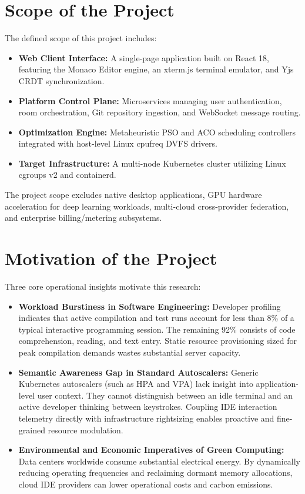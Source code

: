\documentclass[12pt,a4paper]{report}
\begin{document}
	\section{Scope of the Project}
	The defined scope of this project includes:
	\begin{itemize}
		\item \textbf{Web Client Interface:} A single-page application built on React 18, featuring the Monaco Editor engine, an xterm.js terminal emulator, and Yjs CRDT synchronization.
		\item \textbf{Platform Control Plane:} Microservices managing user authentication, room orchestration, Git repository ingestion, and WebSocket message routing.
		\item \textbf{Optimization Engine:} Metaheuristic PSO and ACO scheduling controllers integrated with host-level Linux cpufreq DVFS drivers.
		\item \textbf{Target Infrastructure:} A multi-node Kubernetes cluster utilizing Linux cgroups v2 and containerd.
	\end{itemize}
	
	The project scope excludes native desktop applications, GPU hardware acceleration for deep learning workloads, multi-cloud cross-provider federation, and enterprise billing/metering subsystems.
	
	\section{Motivation of the Project}
	Three core operational insights motivate this research:
	\begin{itemize}
		\item \textbf{Workload Burstiness in Software Engineering:} Developer profiling indicates that active compilation and test runs account for less than 8\% of a typical interactive programming session. The remaining 92\% consists of code comprehension, reading, and text entry. Static resource provisioning sized for peak compilation demands wastes substantial server capacity.
		\item \textbf{Semantic Awareness Gap in Standard Autoscalers:} Generic Kubernetes autoscalers (such as HPA and VPA) lack insight into application-level user context. They cannot distinguish between an idle terminal and an active developer thinking between keystrokes. Coupling IDE interaction telemetry directly with infrastructure rightsizing enables proactive and fine-grained resource modulation.
		\item \textbf{Environmental and Economic Imperatives of Green Computing:} Data centers worldwide consume substantial electrical energy. By dynamically reducing operating frequencies and reclaiming dormant memory allocations, cloud IDE providers can lower operational costs and carbon emissions.
	\end{itemize}
	
\end{document}
